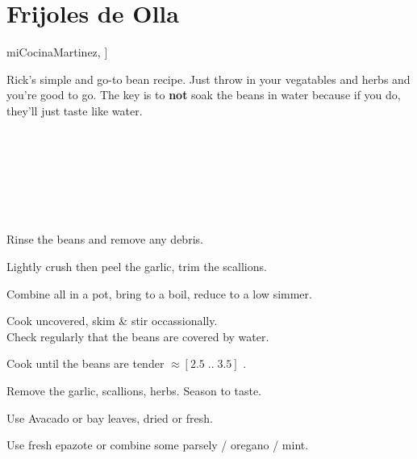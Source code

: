 \section{Frijoles de Olla}\label{frijoles_de_olla}


\begin{recipestats}[
	servings=12 $C$,
	preptime=15 \minute,
	bakingtime=3 \hour,
	original=\citeauthor{miCocinaMartinez}~\cite[p.54]{miCocinaMartinez},
]
\end{recipestats}


\begin{recipeabstract}
	Rick's simple and go-to bean recipe.
	Just throw in your vegatables and herbs and you're good to go.
	The key is to \textbf{not} soak the beans in water because if you do, they'll just taste like water.
\end{recipeabstract}


\begin{ingredientcolumns}
	\begin{ingredientblock}
		\\
		\\
		\\
	\end{ingredientblock}

	\begin{ingredientblock}
		\ingredient[2][leaves]{avocado}\\
		\ingredient[3][sprigs]{epazote}\\
		\ingredient[17][g]{salt}
	\end{ingredientblock}
\end{ingredientcolumns}


\begin{preparation}
	\item Rinse the beans and remove any debris.
	\item Lightly crush then peel the garlic, trim the scallions.
	\item Combine all in a pot, bring to a boil, reduce to a low simmer.
	\item Cook uncovered, skim \& stir occassionally.\\
		Check regularly that the beans are covered by water.
	\item Cook until the beans are tender $\approx[2.5\;..\; 3.5]$ \hour.
	\item Remove the garlic, scallions, herbs. Season to taste.
\end{preparation}


\begin{variation}
	\item Use Avacado or bay leaves, dried or fresh.
	\item Use fresh epazote or combine some parsely / oregano / mint.
\end{variation}


\recipeend%
